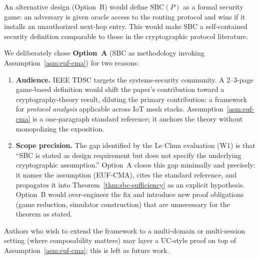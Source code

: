 \begin{remark}
\label{rem:why-not-game}
An alternative design (Option~B) would define $\mathrm{SBC}(P)$ as a
formal security game: an adversary is given oracle access to the
routing protocol and wins if it installs an unauthorized next-hop entry.
This would make SBC a self-contained security definition comparable to
those in the cryptographic protocol literature.

We deliberately chose \textbf{Option~A} (SBC as methodology invoking
Assumption~\ref{asm:euf-cma}) for two reasons:

\begin{enumerate}[label=(\arabic*)]
  \item \textbf{Audience.}  IEEE TDSC targets the systems-security
        community.  A 2--3-page game-based definition would shift the
        paper's contribution toward a cryptography-theory result,
        diluting the primary contribution: a framework for \emph{protocol
        analysis} applicable across IoT mesh stacks.  Assumption~\ref{asm:euf-cma}
        is a one-paragraph standard reference; it anchors the theory
        without monopolizing the exposition.

  \item \textbf{Scope precision.}  The gap identified by the Le Chun
        evaluation (W1) is that ``SBC is stated as design requirement
        but does not specify the underlying cryptographic assumption.''
        Option~A closes this gap minimally and precisely: it names the
        assumption (EUF-CMA), cites the standard reference, and
        propagates it into Theorem~\ref{thm:sbc-sufficiency} as an
        explicit hypothesis.  Option~B would over-engineer the fix and
        introduce new proof obligations (game reduction, simulator
        construction) that are unnecessary for the theorem as stated.
\end{enumerate}

Authors who wish to extend the framework to a multi-domain or
multi-session setting (where composability matters) may layer a
UC-style proof on top of Assumption~\ref{asm:euf-cma}; this is left
as future work.
\end{remark}
